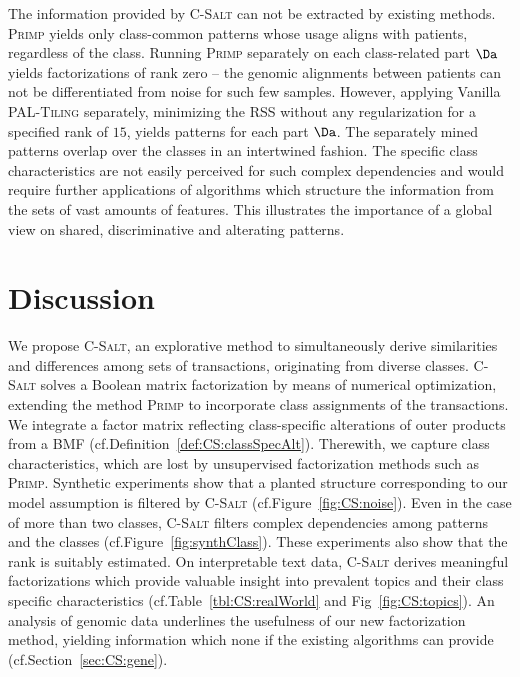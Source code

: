 The information provided by \textsc{C-Salt} can not be extracted by existing methods. \textsc{Primp} yields only class-common patterns whose usage aligns with patients, regardless of the class. Running \textsc{Primp} separately on each class-related part $\Da$ yields factorizations of rank zero -- the genomic alignments between patients can not be differentiated from noise for such few samples.  
However, applying Vanilla \textsc{PAL-Tiling} separately, minimizing the RSS without any regularization for a specified rank of $15$, yields patterns for each part $\Da$. The separately mined patterns overlap over the classes in an intertwined fashion. The specific class characteristics are not easily perceived for such complex dependencies and would require further applications of algorithms which structure the information from the sets of vast amounts of features. This illustrates the importance of a global view on shared, discriminative and alterating patterns.
\section{Discussion}
We propose \textsc{C-Salt}, an explorative method to simultaneously derive similarities and differences among sets of transactions, originating from diverse classes. \textsc{C-Salt} solves a Boolean matrix factorization by means of numerical optimization, extending the method \textsc{Primp} to incorporate class assignments of the transactions. We integrate a factor matrix reflecting class-specific alterations of outer products from a BMF (cf.\@ Definition~\ref{def:CS:classSpecAlt}). Therewith, we capture class characteristics, which are lost by unsupervised factorization methods such as \textsc{Primp}. Synthetic experiments show that a planted structure corresponding to our model assumption is filtered by \textsc{C-Salt} (cf.\@ Figure~\ref{fig:CS:noise}). Even in the case of more than two classes, \textsc{C-Salt} filters complex dependencies among patterns and the classes (cf.\@ Figure~\ref{fig:synthClass}). These experiments also show that the rank is suitably estimated. On interpretable text data, \textsc{C-Salt} derives meaningful factorizations which provide valuable insight into prevalent topics and their class specific characteristics (cf.\@ Table~\ref{tbl:CS:realWorld} and Fig~\ref{fig:CS:topics}). An analysis of genomic data underlines the usefulness of our new factorization method, yielding information which none if the existing algorithms can provide (cf.\@ Section~\ref{sec:CS:gene}).
